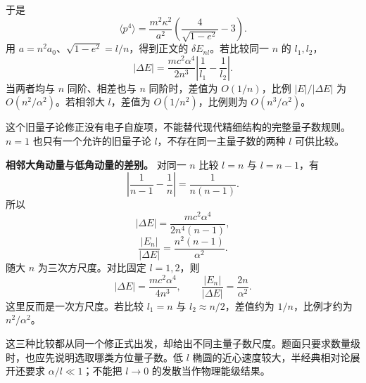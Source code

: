 \documentclass[12pt,a4paper,UTF8]{ctexart}
\begin{document}
于是 \[
\langle p^4\rangle=\frac{m^2\kappa^2}{a^2}\left(\frac4{\sqrt{1-e^2}}-3\right).
\] 用 \(a=n^2a_0\)、\(\sqrt{1-e^2}=l/n\)，得到正文的
\(\delta E_{nl}\)。若比较同一 \(n\) 的 \(l_1,l_2\)， \[
|\Delta E|=\frac{mc^2\alpha^4}{2n^3}\left|\frac1{l_1}-\frac1{l_2}\right|.
\] 当两者均与 \(n\) 同阶、相差也与 \(n\) 同阶时，差值为 \(O(1/n)\)，比例
\(|E|/|\Delta E|\) 为 \(O(n^2/\alpha^2)\)。若相邻大 \(l\)，差值为
\(O(1/n^2)\)，比例则为 \(O(n^3/\alpha^2)\)。

这个旧量子论修正没有电子自旋项，不能替代现代精细结构的完整量子数规则。\(n=1\)
也只有一个允许的旧量子论 \(l\)，不存在同一主量子数的两种 \(l\)
可供比较。

\textbf{相邻大角动量与低角动量的差别。} 对同一 \(n\) 比较 \(l=n\) 与
\(l=n-1\)，有 \[
\left|\frac1{n-1}-\frac1n\right|=\frac1{n(n-1)}.
\] 所以 \[
|\Delta E|=\frac{mc^2\alpha^4}{2n^4(n-1)},
\] \[
\frac{|E_n|}{|\Delta E|}=\frac{n^2(n-1)}{\alpha^2}.
\] 随大 \(n\) 为三次方尺度。对比固定 \(l=1,2\)，则 \[
|\Delta E|=\frac{mc^2\alpha^4}{4n^3},\qquad
\frac{|E_n|}{|\Delta E|}=\frac{2n}{\alpha^2}.
\] 这里反而是一次方尺度。若比较 \(l_1=n\) 与
\(l_2\approx n/2\)，差值约为 \(1/n\)，比例才约为 \(n^2/\alpha^2\)。

这三种比较都从同一个修正式出发，却给出不同主量子数尺度。题面只要求数量级时，也应先说明选取哪类方位量子数。低
\(l\) 椭圆的近心速度较大，半经典相对论展开还要求
\(\alpha/l\ll1\)；不能把 \(l\to0\) 的发散当作物理能级结果。
\end{document}
